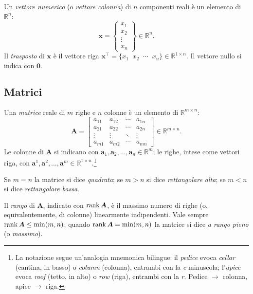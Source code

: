 Un \textit{vettore numerico} (o \textit{vettore colonna}) di $n$ componenti reali \`e un elemento di $\mathbb{R}^n$:
\begin{equation}
	\bm{x} = \begin{Bmatrix} x_1 \\ x_2 \\ \vdots \\ x_n \end{Bmatrix} \in \mathbb{R}^{n}.
\end{equation}
Il \textit{trasposto} di $\bm{x}$ \`e il vettore riga $\bm{x}^\top = \{x_1 \;\; x_2 \;\; \cdots \;\; x_n\} \in \mathbb{R}^{1\times n}$. Il vettore nullo si indica con $\bm{0}$.


\subsection{Matrici}

Una \textit{matrice} reale di $m$ righe e $n$ colonne \`e un elemento di $\mathbb{R}^{m \times n}$:
\begin{equation}
	\bm{A} = \begin{bmatrix}
		a_{11} & a_{12} & \cdots & a_{1n} \\
		a_{21} & a_{22} & \cdots & a_{2n} \\
		\vdots & \vdots & \ddots & \vdots \\
		a_{m1} & a_{m2} & \cdots & a_{mn}
	\end{bmatrix} \in \mathbb{R}^{m \times n}.
\end{equation}
Le colonne di $\bm{A}$ si indicano con $\bm{a}_1, \bm{a}_2, \ldots, \bm{a}_n \in \mathbb{R}^m$; le righe, intese come vettori riga, con $\bm{a}^1, \bm{a}^2, \ldots, \bm{a}^m \in \mathbb{R}^{1\times n}$.\footnote{La notazione segue un'analogia mnemonica bilingue:
	il \emph{pedice} evoca \textit{cellar} (cantina, in basso)
	o \textit{column} (colonna), entrambi con la \textit{c}
	minuscola; l'\emph{apice} evoca \textit{roof} (tetto, in
	alto) o \textit{row} (riga), entrambi con la \textit{r}.
	Pedice $\to$ colonna, apice $\to$ riga.}


Se $m=n$ la matrice si dice \textit{quadrata}; se $m>n$ si dice \textit{rettangolare alta}; se $m<n$ si dice \textit{rettangolare bassa}.

Il \textit{rango} di $\bm{A}$, indicato con $\operatorname{rank}\bm{A}$, \`e il massimo numero di righe (o, equivalentemente, di colonne) linearmente indipendenti. Vale sempre $\operatorname{rank}\bm{A} \leq \min(m,n)$; quando $\operatorname{rank}\bm{A} = \min(m,n)$ la matrice si dice \textit{a rango pieno} (o \textit{massimo}).


